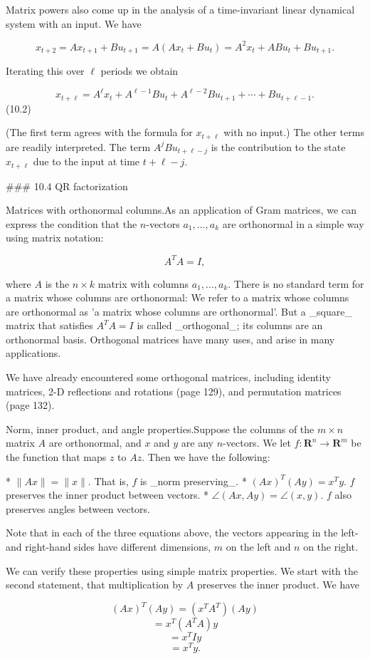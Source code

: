 Matrix powers also come up in the analysis of a time-invariant linear dynamical system with an input. We have

\[x_{t+2}=Ax_{t+1}+Bu_{t+1}=A(Ax_{t}+Bu_{t})=A^{2}x_{t}+ABu_{t}+Bu_{t+1}.\]

Iterating this over \(\ell\) periods we obtain

\[x_{t+\ell}=A^{\ell}x_{t}+A^{\ell-1}Bu_{t}+A^{\ell-2}Bu_{t+1}+\cdots+Bu_{t+\ell -1}.\] (10.2)

(The first term agrees with the formula for \(x_{t+\ell}\) with no input.) The other terms are readily interpreted. The term \(A^{j}Bu_{t+\ell-j}\) is the contribution to the state \(x_{t+\ell}\) due to the input at time \(t+\ell-j\).

### 10.4 QR factorization

Matrices with orthonormal columns.As an application of Gram matrices, we can express the condition that the \(n\)-vectors \(a_{1},\ldots,a_{k}\) are orthonormal in a simple way using matrix notation:

\[A^{T}A=I,\]

where \(A\) is the \(n\times k\) matrix with columns \(a_{1},\ldots,a_{k}\). There is no standard term for a matrix whose columns are orthonormal: We refer to a matrix whose columns are orthonormal as 'a matrix whose columns are orthonormal'. But a _square_ matrix that satisfies \(A^{T}A=I\) is called _orthogonal_; its columns are an orthonormal basis. Orthogonal matrices have many uses, and arise in many applications.

We have already encountered some orthogonal matrices, including identity matrices, 2-D reflections and rotations (page 129), and permutation matrices (page 132).

Norm, inner product, and angle properties.Suppose the columns of the \(m\times n\) matrix \(A\) are orthonormal, and \(x\) and \(y\) are any \(n\)-vectors. We let \(f:\mathbf{R}^{n}\rightarrow\mathbf{R}^{m}\) be the function that maps \(z\) to \(Az\). Then we have the following:

* \(\|Ax\|=\|x\|\). That is, \(f\) is _norm preserving_.
* \((Ax)^{T}(Ay)=x^{T}y\). \(f\) preserves the inner product between vectors.
* \(\angle(Ax,Ay)=\angle(x,y)\). \(f\) also preserves angles between vectors.

Note that in each of the three equations above, the vectors appearing in the left- and right-hand sides have different dimensions, \(m\) on the left and \(n\) on the right.

We can verify these properties using simple matrix properties. We start with the second statement, that multiplication by \(A\) preserves the inner product. We have

\[(Ax)^{T}(Ay) = (x^{T}A^{T})(Ay)\] \[= x^{T}(A^{T}A)y\] \[= x^{T}Iy\] \[= x^{T}y.\] 